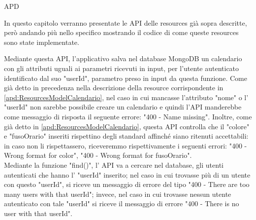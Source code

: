 \begin{listaPersonale} {APD}
\begin{listaPersonale2}[APD]{}
\begin{listaPersonale3}[APD]{}
\begin{itemize}
            \end{itemize}
            \begin{center}
                
            \end{center}
        \end{listaPersonale3}
    \end{listaPersonale2}
    In questo capitolo verranno presentate le API delle resources già sopra descritte, però andando più nello specifico mostrando il codice di come queste resources sono state implementate.
    \begin{listaPersonale2}[APD]{}
                Mediante questa API, l'applicativo salva nel database MongoDB un calendario con gli attributi uguali ai parametri ricevuti in input, per l'utente autenticato identificato dal suo "userId", parametro preso in input da questa funzione.
                Come già detto in precedenza nella descrizione della resource corrispondente in \ref{apd:ResourcesModelCalendario}, nel caso in cui mancasse l'attributo "nome" o l' "userId" non sarebbe possibile creare un calendario e quindi l'API manderebbe come messaggio di risposta il seguente errore: "400 - Name missing". Inoltre, come già detto in \ref{apd:ResourcesModelCalendario}, questa API controlla che il "colore" e "fusoOrario" inseriti rispettino degli standard affinché siano ritenuti accettabili: in caso non li rispettassero, riceveremmo rispettivamente i seguenti errori: "400 - Wrong format for color", "400 - Wrong format for fusoOrario". \\
                Mediante la funzione "find()", l' API va a cercare nel database, gli utenti autenticati che hanno l' "userId" inserito; nel caso in cui trovasse più di un utente con questo "userId", si riceve un messaggio di errore del tipo "400 - There are too many users with that userId"; invece, nel caso in cui trovasse nessun utente autenticato con tale "userId" si riceve il messaggio di errore "400 - There is no user with that userId". \\

\end{listaPersonale2}
\end{listaPersonale}
